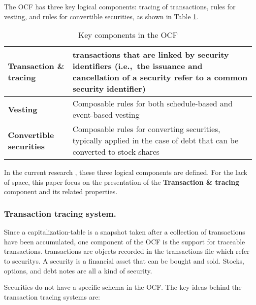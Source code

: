 
The OCF has three key logical components: tracing of transactions, rules for vesting, and rules for convertible securities, as shown in Table \ref{tab:ocf-key-components}.

\begin{table}[!h]
	\begin{tabularx}{\textwidth}{lX}
		\toprule
		\textbf{Transaction \& tracing} & \Glspl{transaction} that are linked by \gls{security} identifiers (i.e.,\ the issuance and cancellation of a \gls{security} refer to a common \gls{security} identifier) \\
		\midrule
		\textbf{Vesting}                & Composable rules for both schedule-based and event-based vesting                                                                               \\
		\midrule
		\textbf{Convertible securities} & Composable rules for converting securities, typically applied in the case of \gls{debt} that can be converted to stock shares                        \\
		\bottomrule
	\end{tabularx}
	\caption{Key components in the OCF}\label{tab:ocf-key-components}
\end{table}

In the current research \cite{thesis:Stevaux}, these three logical components are defined. For the lack of space, this paper focus on the presentation of the \textbf{Transaction \& tracing} component and its related properties.

\subsubsection{Transaction tracing system.}
%
Since a \gls{capitalization-table} is a snapshot taken after a collection of \glspl{transaction} have been accumulated, one component of the OCF is the support for traceable \glspl{transaction}. \Glspl{transaction} are objects recorded in the \glspl{transaction} file which refer to  \glspl{security}.  A \gls{security} is a financial \gls{asset} that can be bought and sold. Stocks, options, and \gls{debt} notes are all a kind of \gls{security}. 

Securities do not have a specific schema in the OCF\@{}.
%
The key ideas behind the transaction tracing systems are:

